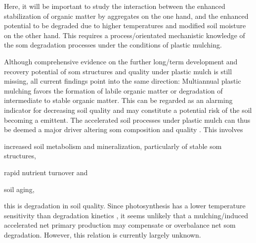 Here, it will be important to study the interaction between the enhanced stabilization of organic matter by aggregates on the one hand, and the enhanced potential to be degraded due to higher temperatures and modified soil moisture on the other hand. This requires a process\-/orientated mechanistic knowledge of the \ac{som} degradation processes under the conditions of plastic mulching.

Although comprehensive evidence on the further long\-/term development and recovery potential of \ac{som} structures and quality under plastic mulch is still missing, all current findings point into the same direction: Multiannual plastic mulching favors the formation of labile organic matter or degradation of intermediate to stable organic matter. This can be regarded as an alarming indicator for decreasing soil quality and may constitute a potential risk of the soil becoming a  emittent. The accelerated soil processes under plastic mulch can thus be deemed a major driver altering \ac{som} composition and quality \citep{SchmidtPersistence2011,vonLutzowTemperature2009}. This involves
\begin{enumerate*}
	\item increased soil metabolism and mineralization, particularly of stable \ac{som} structures,
	\item rapid nutrient turnover and
	\item soil aging,
\end{enumerate*}
this is degradation in soil quality. Since photosynthesis has a lower temperature sensitivity than degradation kinetics \citep{KirschbaumWill2000}, it seems unlikely that a mulching\-/induced accelerated net primary production may compensate or overbalance net \ac{som} degradation. However, this relation is currently largely unknown.

